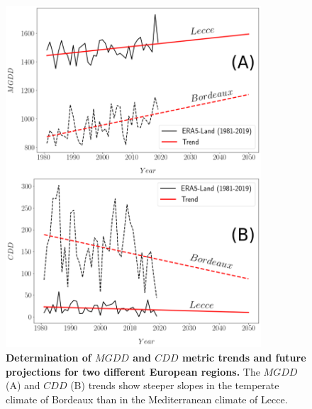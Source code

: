 \begin{figure}[H]
    \centering
    \includegraphics[width=0.85\textwidth]{Figures/MGDD_CDD_trends.png}
    \caption[Determination of $MGDD$ and $CDD$ trends and
        future extrapolations]{\textbf{Determination of $MGDD$ and $CDD$ metric
            trends
            and
            future projections for two different European regions.} The $MGDD$
        (A) and
        $CDD$ (B) trends show steeper slopes in the temperate climate of
        Bordeaux than
        in the Mediterranean climate of Lecce.}
    \label{figS12} %
\end{figure}

